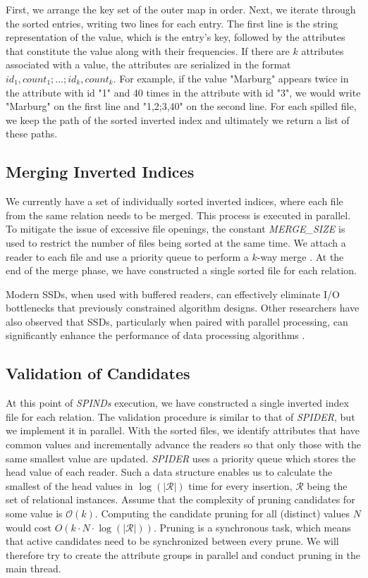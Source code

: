 First, we arrange the key set of the outer map in order. Next, we iterate through the sorted entries, writing two lines for each entry. The first line is the string representation of the value, which is the entry's key, followed by the attributes that constitute the value along with their frequencies. If there are $k$ attributes associated with a value, the attributes are serialized in the format $id_1,count_1;\dots;id_k,count_k$. For example, if the value "Marburg" appears twice in the attribute with id "1" and 40 times in the attribute with id "3", we would write "Marburg" on the first line and "1,2;3,40" on the second line. For each spilled file, we keep the path of the sorted inverted index and ultimately we return a list of these paths.

\subsection{Merging Inverted Indices}\label{subsec:spind_merge}
We currently have a set of individually sorted inverted indices, where each file from the same relation needs to be merged. This process is executed in parallel. To mitigate the issue of excessive file openings, the constant \textit{MERGE\_SIZE} is used to restrict the number of files being sorted at the same time. We attach a reader to each file and use a priority queue to perform a $k$-way merge \cite{taniar2008high}. At the end of the merge phase, we have constructed a single sorted file for each relation.

Modern SSDs, when used with buffered readers, can effectively eliminate I/O bottlenecks that previously constrained algorithm designs. Other researchers have also observed that SSDs, particularly when paired with parallel processing, can significantly enhance the performance of data processing algorithms \cite{meena2014performance}.

\subsection{Validation of Candidates}\label{sec:spind_val}
At this point of \textit{SPINDs} execution, we have constructed a single inverted index file for each relation. The validation procedure is similar to that of \textit{SPIDER}, but we implement it in parallel. With the sorted files, we identify attributes that have common values and incrementally advance the readers so that only those with the same smallest value are updated. \textit{SPIDER} uses a priority queue which stores the head value of each reader. Such a data structure enables us to calculate the smallest of the head values in $\log(|\mathcal{R}|)$ time for every insertion, $\mathcal{R}$ being the set of relational instances. Assume that the complexity of pruning candidates for some value is $\mathcal{O}(k)$. Computing the candidate pruning for all (distinct) values $N$ would cost $O(k \cdot N \cdot \log(|\mathcal{R}|))$. Pruning is a synchronous task, which means that active candidates need to be synchronized between every prune. We will therefore try to create the attribute groups in parallel and conduct pruning in the main thread.

